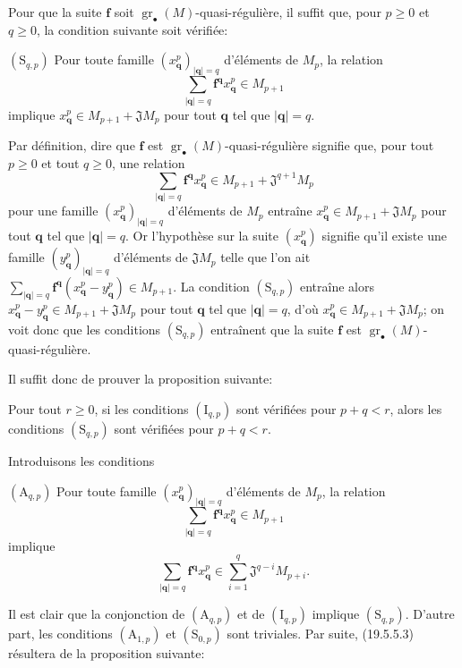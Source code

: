 \begin{env}[19.5.5.2]
\label{IV.19.5.5.2}
Pour que la suite $\mathbf f$ soit $\operatorname{gr}_\bullet(M)$-quasi-régulière, il suffit que, pour $p\geq0$ et $q\geq0$, la condition suivante soit vérifiée:

$(\mathrm S_{q,p})$ Pour toute famille $(x_{\mathbf q}^p)_{|\mathbf q|=q}$ d'éléments de $M_p$, la relation
\[
  \sum_{|\mathbf q|=q}\mathbf f^{\mathbf q}x_{\mathbf q}^p\in M_{p+1}
\]
implique $x_{\mathbf q}^p\in M_{p+1}+\mathfrak JM_p$ pour tout $\mathbf q$ tel que $|\mathbf q|=q$.

Par définition, dire que $\mathbf f$ est $\operatorname{gr}_\bullet(M)$-quasi-régulière signifie que, pour tout $p\geq0$ et tout $q\geq0$, une relation
\[
  \sum_{|\mathbf q|=q}\mathbf f^{\mathbf q}x_{\mathbf q}^p\in M_{p+1}+\mathfrak J^{q+1}M_p
\]
pour une famille $(x_{\mathbf q}^p)_{|\mathbf q|=q}$ d'éléments de $M_p$ entraîne $x_{\mathbf q}^p\in M_{p+1}+\mathfrak JM_p$ pour tout $\mathbf q$ tel que $|\mathbf q|=q$. Or l'hypothèse sur la suite $(x_{\mathbf q}^p)$ signifie qu'il existe une famille $(y_{\mathbf q}^p)_{|\mathbf q|=q}$ d'éléments de $\mathfrak JM_p$ telle que l'on ait $\sum_{|\mathbf q|=q}\mathbf f^{\mathbf q}(x_{\mathbf q}^p-y_{\mathbf q}^p)\in M_{p+1}$. La condition $(\mathrm S_{q,p})$ entraîne alors $x_{\mathbf q}^p-y_{\mathbf q}^p\in M_{p+1}+\mathfrak JM_p$ pour tout $\mathbf q$ tel que $|\mathbf q|=q$, d'où $x_{\mathbf q}^p\in M_{p+1}+\mathfrak JM_p$; on voit donc que les conditions $(\mathrm S_{q,p})$ entraînent que la suite $\mathbf f$ est $\operatorname{gr}_\bullet(M)$-quasi-régulière.
\end{env}

Il suffit donc de prouver la proposition suivante:

\begin{env}[19.5.5.3]
\label{IV.19.5.5.3}
Pour tout $r\geq0$, si les conditions $(\mathrm I_{q,p})$ sont vérifiées pour $p+q<r$, alors les conditions $(\mathrm S_{q,p})$ sont vérifiées pour $p+q<r$.

Introduisons les conditions

$(\mathrm A_{q,p})$ Pour toute famille $(x_{\mathbf q}^p)_{|\mathbf q|=q}$ d'éléments de $M_p$, la relation
\[
  \sum_{|\mathbf q|=q}\mathbf f^{\mathbf q}x_{\mathbf q}^p\in M_{p+1}
\]
implique
\[
  \sum_{|\mathbf q|=q}\mathbf f^{\mathbf q}x_{\mathbf q}^p\in\sum_{i=1}^q\mathfrak J^{q-i}M_{p+i}.
\]

Il est clair que la conjonction de $(\mathrm A_{q,p})$ et de $(\mathrm I_{q,p})$ implique $(\mathrm S_{q,p})$. D'autre part, les conditions $(\mathrm A_{1,p})$ et $(\mathrm S_{0,p})$ sont triviales. Par suite, (19.5.5.3) résultera de la proposition suivante:
\end{env}

